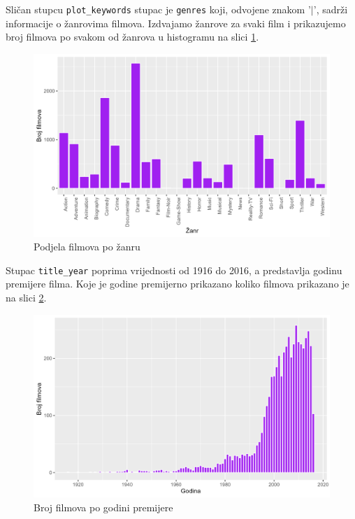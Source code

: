 	 Sličan stupcu \texttt{plot\_keywords} stupac je \texttt{genres} koji, odvojene znakom '$|$', sadrži informacije o žanrovima filmova. Izdvajamo žanrove za svaki film i prikazujemo broj filmova po svakom od žanrova u histogramu na slici \ref{filmovi_zanr}.
	 
	 \begin{figure}[H]
	 	\centering
	 	\includegraphics[width=15cm]{../figures/analysis/broj_filmova_po_zanru.png}
	 	\caption{Podjela filmova po žanru}
	 	\label{filmovi_zanr}
	 \end{figure}
	 
	 Stupac \texttt{title\_year} poprima vrijednosti od 1916 do 2016, a predstavlja godinu premijere filma. Koje je godine premijerno prikazano koliko filmova prikazano je na slici \ref{filmovi_godine}.
	 
	  \begin{figure}[H]
	 	\centering
	 	\includegraphics[width=15cm]{../figures/analysis/broj_filmova_po_godini.png}
	 	\caption{Broj filmova po godini premijere}
	 	\label{filmovi_godine}
	 \end{figure}
	 

